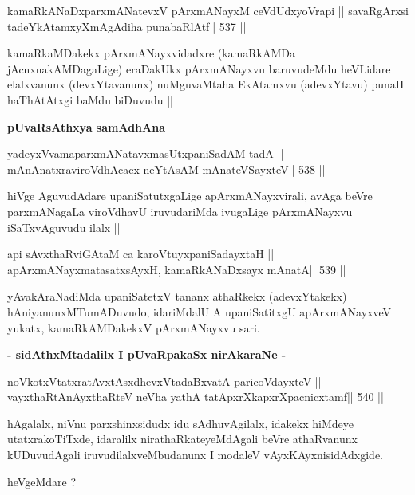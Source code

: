 \begin{shl}
kamaRkANaDxparxmANatevxV pArxmANayxM ceVdUdxyoVrapi ||
savaRgArxsi tadeYkAtamxyXmAgAdiha punabaRlAtf\hfill || 537 ||
\end{shl}

\begin{artha}
kamaRkaMDakekx pArxmANayxvidadxre (kamaRkAMDa jAcnxnakAMDagaLige)
eraDakUkx pArxmANayxvu baruvudeMdu heVLidare elalxvanunx
(devxYtavanunx) nuMguvaMtaha EkAtamxvu (adevxYtavu) punaH haThAtAtxgi
baMdu biDuvudu ||
\end{artha} 

\medskip
\centerline{\textbf{pUvaRsAthxya samAdhAna}}

\begin{shl}
yadeyxVvamaparxmANatavxmasUtxpaniSadAM tadA ||
mAnAnatxraviroVdhAcacx neYtAsAM mAnateVSayxteV\hfill || 538 ||
\end{shl}

\begin{artha}
hiVge AguvudAdare upaniSatutxgaLige apArxmANayxvirali, avAga beVre
parxmANagaLa viroVdhavU iruvudariMda ivugaLige pArxmANayxvu
iSaTxvAguvudu ilalx ||
\end{artha}

\begin{shl}
api sAvxthaRviGAtaM ca karoVtuyxpaniSadayxtaH ||
apArxmANayxmatasatxsAyxH, kamaRkANaDxsayx mAnatA\hfill || 539 ||
\end{shl}

\begin{artha}
yAvakAraNadiMda upaniSatetxV tananx athaRkekx (adevxYtakekx)
hAniyanunxMTumADuvudo, idariMdalU A upaniSatitxgU apArxmANayxveV
yukatx, kamaRkAMDakekxV pArxmANayxvu sari.
\end{artha}

\medskip
\centerline{\textbf{- sidAthxMtadalilx I pUvaRpakaSx nirAkaraNe -}}

\begin{shl}
noVkotxVtatxratAvxtAsxdhevxVtadaBxvatA paricoVdayxteV ||
vayxthaRtAnAyxthaRteV neVha yathA tatApxrXkapxrXpacnicxtamf\hfill || 540 ||
\end{shl}

\begin{artha}
hAgalalx, niVnu parxshinxsidudx idu sAdhuvAgilalx, idakekx hiMdeye
utatxrakoTiTxde, idaralilx nirathaRkateyeMdAgali beVre athaRvanunx
kUDuvudAgali iruvudilalxveMbudanunx I modaleV vAyxKAyxnisidAdxgide.

heVgeMdare ?
\end{artha}

